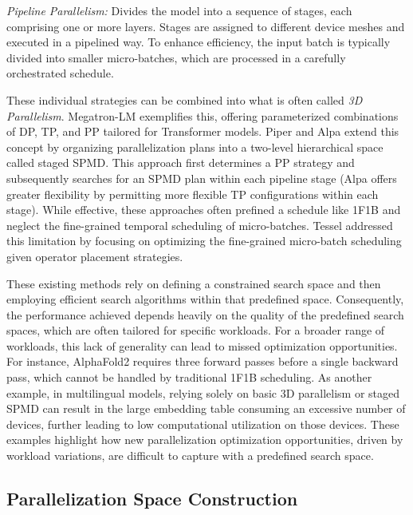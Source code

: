 \textit{Pipeline Parallelism:}  Divides the model into a sequence of stages, each comprising one or more layers.  Stages are assigned to different device meshes and executed in a pipelined way. To enhance efficiency, the input batch is typically divided into smaller micro-batches, which are processed in a carefully orchestrated schedule.

These individual strategies can be combined into what is often called \textit{3D Parallelism}. Megatron-LM exemplifies this, offering parameterized combinations of DP, TP, and PP tailored for Transformer models. Piper and Alpa extend this concept by organizing parallelization plans into a two-level hierarchical space called staged SPMD. This approach first determines a PP strategy and subsequently searches for an SPMD plan within each pipeline stage (Alpa offers greater flexibility by permitting more flexible TP configurations within each stage). While effective, these approaches often prefined a schedule like 1F1B and neglect the fine-grained temporal scheduling of micro-batches. Tessel addressed this limitation by focusing on optimizing the fine-grained micro-batch scheduling given operator placement strategies.

These existing methods rely on defining a constrained search space and then employing efficient search algorithms within that predefined space. Consequently, the performance achieved depends heavily on the quality of the predefined search spaces, which are often tailored for specific workloads. For a broader range of workloads, this lack of generality can lead to missed optimization opportunities. For instance,  AlphaFold2 requires three forward passes before a single backward pass, which cannot be handled by traditional 1F1B scheduling. As another example, in multilingual models, relying solely on basic 3D parallelism or staged SPMD can result in the large embedding table consuming an excessive number of devices, further leading to low computational utilization on those devices. These examples highlight how new parallelization optimization opportunities, driven by workload variations, are difficult to capture with a predefined search space.

\subsection{Parallelization Space Construction}


